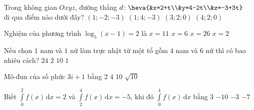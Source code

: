 \begin{ex}%
Trong không gian $Oxyz$, đường thẳng $d\colon \heva{&x=2+t\\&y=4-2t\\&z=-3+3t}$	đi qua điểm nào dưới đây?
	\choice
	{$(1;-2;-3)$}
	{$(1;4;-3)$}
	{\True $(3;2;0)$}
	{$(4;2;0)$}
\end{ex}

\begin{ex}%
	Nghiệm của phương trình $\log_5(x-1)=2$ là
	\choice
	{$x=11$}
	{$x=6$}
	{\True $x=26$}
	{$x=2$}
\end{ex}

\begin{ex}%
	Nếu chọn $1$ nam và $1$ nữ làm trực nhật từ một tổ gồm $4$ nam và $6$ nữ thì có bao nhiêu cách?
	\choice
	{\True $24$}
	{$2$}
	{$10$}
	{$1$}
\end{ex}

\begin{ex}%
	Mô-đun của số phức $3i+1$ bằng
	\choice
	{$2$}
	{$4$}
	{$10$}
	{\True $\sqrt{10}$}
\end{ex}

\begin{ex}%
	Biết $\displaystyle\int\limits_{0}^{2}f(x)\mathrm{\,d}x=2$ và $\displaystyle\int\limits_{2}^{4}f(x)\mathrm{\,d}x=-5$, khi đó $\displaystyle\int\limits_{0}^{4}f(x)\mathrm{\,d}x$ bằng
	\choice
	{$3$}
	{$-10$}
	{\True $-3$}
	{$-7$}
\end{ex}

